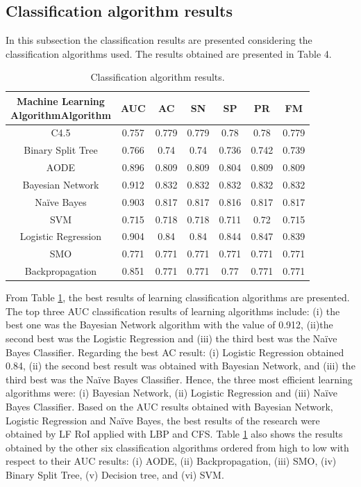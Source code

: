 \documentclass[review]{elsarticle}
\begin{document}
\subsection{Classification algorithm results}

In this subsection the classification results are presented considering the classification algorithms used. The results obtained are presented in Table 4.

\begin{table}[h!]
	\centering
	\begin{tabular}{|c|c|c|c|c|c|c|}
		\hline 
		\backslashbox{Machine Learning \\ Algorithm}{Algorithm} &AUC&AC&SN&SP&PR&FM\\
		\hline  
		C4.5		& 0.757 &	0.779 &	0.779 &	0.78 &	0.78 &	0.779\\
		\hline
		Binary Split Tree	& 0.766	& 0.74	& 0.74	& 0.736	& 0.742	& 0.739 \\
		\hline 
		AODE	& 0.896	& 0.809	& 0.809	& 0.804	& 0.809	& 0.809 \\
		\hline 
	\cellcolor{blue!25}	Bayesian Network	& \cellcolor{blue!25}0.912	& \cellcolor{blue!25}0.832	& \cellcolor{blue!25}0.832	& \cellcolor{blue!25}0.832	& \cellcolor{blue!25}0.832	& \cellcolor{blue!25}0.832\\
		\hline 
		Na\"ive Bayes	& 0.903	& 0.817	& 0.817	& 0.816	& 0.817	& 0.817 \\
		\hline 
		SVM			& 0.715	& 0.718	& 0.718	& 0.711	& 0.72	& 0.715 \\
		\hline 
		Logistic Regression	& 0.904	& 0.84	& 0.84	& 0.844	& 0.847	& 0.839 \\
		\hline 
		SMO			& 0.771	& 0.771	& 0.771	& 0.771	& 0.771	& 0.771 \\
		\hline 
		Backpropagation	& 0.851	& 0.771	& 0.771	& 0.77	& 0.771	& 0.771 \\
		\hline 
	\end{tabular} 
	\caption{Classification algorithm results.}
	\label{tab:AlgorithmResult}
\end{table}

From Table \ref{tab:AlgorithmResult}, the best results of learning classification algorithms are presented. The top three AUC classification results of learning algorithms include: (i) the best one was the Bayesian Network algorithm with the value of 0.912, (ii)the second best was the Logistic Regression and (iii) the third best was the Na\"ive Bayes Classifier. Regarding the best AC result: (i) Logistic Regression obtained 0.84, (ii) the second best result was obtained with Bayesian Network, and (iii) the third best was the Na\"ive Bayes Classifier. Hence, the three most efficient learning algorithms were: (i) Bayesian Network, (ii) Logistic Regression and (iii) Na\"ive Bayes Classifier. Based on the AUC results obtained with Bayesian Network, Logistic Regression and Na\"ive Bayes, the best results of the research were obtained by LF RoI applied with LBP and CFS. Table \ref{tab:AlgorithmResult} also shows the results obtained by the other six classification algorithms ordered from high to low with respect to their AUC results: (i) AODE, (ii) Backpropagation, (iii) SMO, (iv) Binary Split Tree, (v) Decision tree, and (vi) SVM. 
\end{document}
